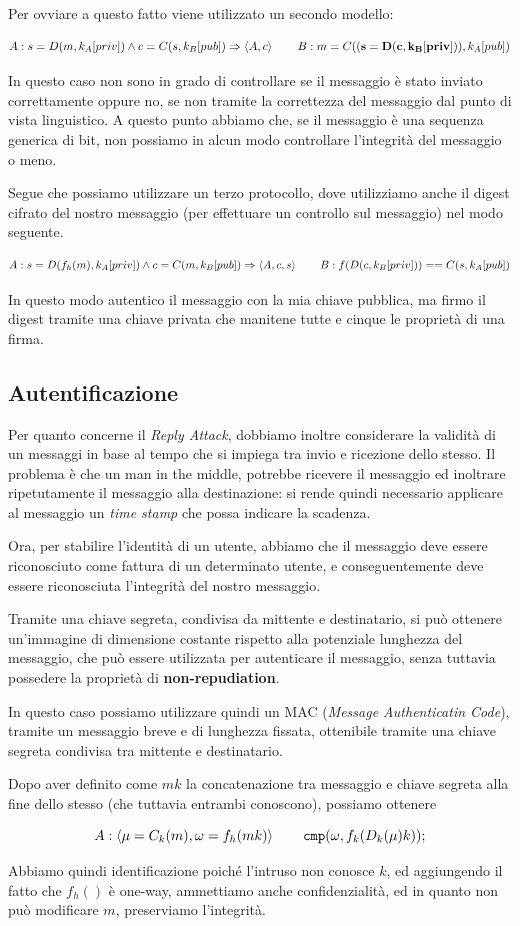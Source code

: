 Per ovviare a questo fatto viene utilizzato un secondo modello:

\[A:s=D(m,k_A[priv])\wedge c=C(s,k_B[pub])\Rightarrow\Braket{A,c}\quad\quad B:m=C((\mathbf{s=D(c,k_B[priv])}),k_A[pub])\]

In questo caso non sono in grado di controllare se il messaggio è stato
inviato correttamente oppure no, se non tramite la correttezza del messaggio
dal punto di vista linguistico. A questo punto abbiamo che, se il messaggio è
una sequenza generica di bit, non possiamo in alcun modo controllare l'integrità
del messaggio o meno.

Segue che possiamo utilizzare un terzo protocollo, dove utilizziamo anche il
digest cifrato del nostro messaggio (per effettuare un controllo sul messaggio)
nel modo seguente.

\[A:s=D(f_h(m),k_A[priv])\wedge c=C(m,k_B[pub])\Rightarrow \Braket{A,c,s} \quad\quad B:f(D(c,k_B[priv]))==C(s,k_A[pub])\]

In questo modo autentico il messaggio con la mia chiave pubblica, ma firmo il 
digest tramite una chiave privata che manitene tutte e cinque le proprietà di una
firma.

\subsection{Autentificazione}
Per quanto concerne il \textit{Reply Attack}, dobbiamo inoltre considerare la validità 
di un messaggi in base
al tempo che si impiega tra invio e ricezione dello stesso. Il problema è che
un man in the middle, potrebbe ricevere il messaggio ed inoltrare ripetutamente
il messaggio alla destinazione: si rende quindi necessario applicare al messaggio
un \textit{time stamp} che possa indicare la scadenza. 

Ora, per stabilire l'identità di un utente, abbiamo che il messaggio deve
essere riconosciuto come fattura di un determinato utente, e conseguentemente
deve essere riconosciuta l'integrità del nostro messaggio.


Tramite una chiave segreta, condivisa da mittente e destinatario, si può
ottenere un'immagine di dimensione costante rispetto alla potenziale lunghezza
del messaggio, che può essere utilizzata per autenticare il messaggio, senza 
tuttavia possedere la proprietà di \textbf{non-repudiation}.

In questo caso possiamo utilizzare quindi un MAC (\textit{Message Authenticatin Code}),
tramite un messaggio breve e di lunghezza fissata, ottenibile tramite una chiave
segreta condivisa tra mittente e destinatario.

Dopo aver definito come $mk$ la concatenazione tra messaggio e chiave segreta 
alla fine dello stesso (che tuttavia entrambi conoscono), possiamo ottenere

\[A:\Braket{\mu=C_k(m),\omega=f_h(mk)}\quad\quad \mathtt{cmp}(\omega,f_k(D_k(\mu)k)); \] 


Abbiamo quindi identificazione poiché l'intruso non conosce $k$, ed aggiungendo
il fatto che $f_h()$ è one-way, ammettiamo anche confidenzialità, ed in quanto
non può modificare $m$, preserviamo l'integrità.
